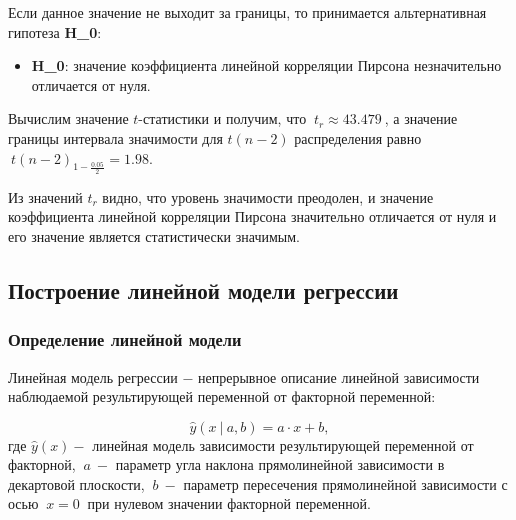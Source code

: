 \documentclass[
]{article}
\providecommand{\tightlist}{%
  \setlength{\itemsep}{0pt}\setlength{\parskip}{0pt}}
\begin{document}
Если данное значение не выходит за границы, то принимается
альтернативная гипотеза \textbf{H\_0}:

\begin{itemize}
\tightlist
\item
  \textbf{H\_0}: значение коэффициента линейной корреляции Пирсона
  незначительно отличается от нуля.
\end{itemize}

Вычислим значение \(t\)-статистики и получим, что
\(\ t_r \approx 43.479\ \), а значение границы интервала значимости для
\(t(n-2)\) распределения равно \(\ t(n-2)_{1- \frac{0.05}{2}} = 1.98\).

Из значений \(t_r\) видно, что уровень значимости преодолен, и значение
коэффициента линейной корреляции Пирсона значительно отличается от нуля
и его значение является статистически значимым.

\hypertarget{ux43fux43eux441ux442ux440ux43eux435ux43dux438ux435-ux43bux438ux43dux435ux439ux43dux43eux439-ux43cux43eux434ux435ux43bux438-ux440ux435ux433ux440ux435ux441ux441ux438ux438}{%
\subsection{\texorpdfstring{\textbf{Построение линейной модели
регрессии}}{Построение линейной модели регрессии}}\label{ux43fux43eux441ux442ux440ux43eux435ux43dux438ux435-ux43bux438ux43dux435ux439ux43dux43eux439-ux43cux43eux434ux435ux43bux438-ux440ux435ux433ux440ux435ux441ux441ux438ux438}}

\hypertarget{ux43eux43fux440ux435ux434ux435ux43bux435ux43dux438ux435-ux43bux438ux43dux435ux439ux43dux43eux439-ux43cux43eux434ux435ux43bux438}{%
\subsubsection{\texorpdfstring{\textbf{Определение линейной
модели}}{Определение линейной модели}}\label{ux43eux43fux440ux435ux434ux435ux43bux435ux43dux438ux435-ux43bux438ux43dux435ux439ux43dux43eux439-ux43cux43eux434ux435ux43bux438}}

Линейная модель регрессии \(-\) непрерывное описание линейной
зависимости наблюдаемой результирующей переменной от факторной
переменной:

\[
\hat{y}(x\ |\ a,b) = a\cdot x + b,
\] где \(\hat{y}(x) -\) линейная модель зависимости результирующей
переменной от факторной, \(\ a\ -\) параметр угла наклона прямолинейной
зависимости в декартовой плоскости, \(\ b\ -\) параметр пересечения
прямолинейной зависимости с осью \(\ x = 0\ \) при нулевом значении
факторной переменной.
\end{document}
